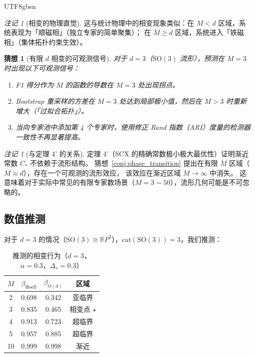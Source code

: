 \documentclass[12pt,a4paper]{article}
\theoremstyle{plain}
\newtheorem{conjecture}[theorem]{猜想}
\theoremstyle{definition}
\theoremstyle{remark}
\newtheorem{remark}[theorem]{注记}
\newcommand{\R}{\mathbb{R}}
\newcommand{\Od}{\mathrm{O}(d)}
\newcommand{\SO}{\mathrm{SO}}
\begin{document}
\begin{CJK}{UTF8}{gbsn}
\begin{remark}[相变的物理直觉]
这与统计物理中的相变现象类似：在 $M < d$ 区域，系统表现为「顺磁相」（独立专家的简单聚集）；
在 $M \geq d$ 区域，系统进入「铁磁相」（集体拓扑约束生效）。
\end{remark}

\begin{conjecture}[有限 $d$ 相变的可观测信号]\label{conj:observable}
对于 $d = 3$（$\SO(3)$ 流形），预测在 $M = 3$ 时出现以下可观测信号：
\begin{enumerate}
    \item F1 得分作为 $M$ 的函数的导数在 $M=3$ 处出现拐点。
    \item Bootstrap 重采样的方差在 $M=3$ 处达到局部极小值，然后在 $M > 3$ 时重新增大（「过拟合拓扑」）。
    \item 当向专家池中添加第 4 个专家时，使用修正 Rand 指数（ARI）度量的检测器一致性不再显著提高。
\end{enumerate}
\end{conjecture}

\begin{remark}[与定理 4' 的关系]
定理 4'（SCX 的精确常数极小极大最优性）证明渐近常数 $C_*$ 不依赖于流形结构。
猜想~\ref{conj:phase_transition} 提出在有限 $M$ 区域（$M \approx d$），存在一个可观测的流形效应，
该效应在渐近区域 $M \to \infty$ 中消失。
这意味着对于实际中常见的有限专家数场景（$M = 3\sim 50$），流形几何可能是不可忽略的。
\end{remark}

\subsection{数值推测}

对于 $d = 3$ 的情况（$\SO(3) \cong \R P^3$），$\mathrm{cat}(\SO(3)) = 3$，我们推测：

\begin{table}[h!]
\centering
\caption{推测的相变行为（$d=3$，$\alpha = 0.3$，$\Delta_s = 0.3$）}
\begin{tabular}{c|ccc}
\toprule
$M$ & $\beta_{\text{Hoeff}}$ & $\beta_{\Od}$ & 区域 \\
\midrule
2  & 0.698 & 0.342 & 亚临界 \\
3  & 0.835 & 0.465 & 相变点 $\star$ \\
4  & 0.913 & 0.723 & 超临界 \\
5  & 0.957 & 0.885 & 超临界 \\
10 & 0.999 & 0.998 & 渐近 \\
\bottomrule
\end{tabular}
\end{table}


\end{CJK}
\end{document}
